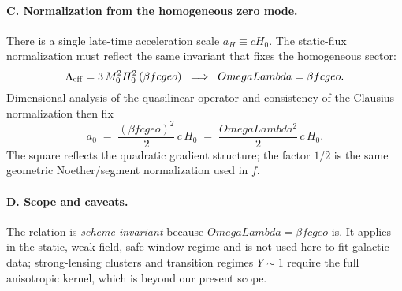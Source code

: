 \documentclass[aps,prd,onecolumn,superscriptaddress,nofootinbib]{revtex4-2}
\def\OmL{OmegaLambda}%
\def\cgeo{cgeo}%
\newcommand{\OmL}{\Omega_\Lambda}
\newcommand{\cgeo}{c_{\rm geo}}
\begin{document}
\paragraph*{C. Normalization from the homogeneous zero mode.}
There is a single late-time acceleration scale $a_H\equiv cH_0$. The static-flux normalization must reflect the same invariant that fixes the homogeneous sector:
\begin{equation}
\Lambda_{\rm eff}=3\,M_0^2 H_0^2\,(\beta f \cgeo) \;\;\Longrightarrow\;\; \OmL=\beta f \cgeo.
\end{equation}
Dimensional analysis of the quasilinear operator and consistency of the Clausius normalization then fix
\begin{equation}
a_0 \;=\; \frac{(\beta f \cgeo)^2}{2}\,c\,H_0 \;=\; \frac{\OmL^2}{2}\,c\,H_0.
\end{equation}
The square reflects the quadratic gradient structure; the factor $1/2$ is the same geometric Noether/segment normalization used in $f$.

\paragraph*{D. Scope and caveats.}
The relation is \emph{scheme-invariant} because $\OmL=\beta f \cgeo$ is. It applies in the static, weak-field, safe-window regime and is not used here to fit galactic data; strong-lensing clusters and transition regimes $Y\!\sim\!1$ require the full anisotropic kernel, which is beyond our present scope.
\end{document}
